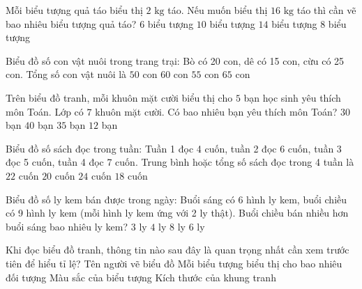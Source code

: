 \begin{ex} %
Mỗi biểu tượng quả táo biểu thị $2\text{ kg}$ táo. Nếu muốn biểu thị $16\text{ kg}$ táo thì cần vẽ bao nhiêu biểu tượng quả táo?
\choice
{$6$ biểu tượng}
{$10$ biểu tượng}
{$14$ biểu tượng}
{\True $8$ biểu tượng}
\end{ex}

\begin{ex} %
Biểu đồ số con vật nuôi trong trang trại: Bò có 20 con, dê có 15 con, cừu có 25 con. Tổng số con vật nuôi là
\choice
{$50$ con}
{\True $60$ con}
{$55$ con}
{$65$ con}
\end{ex}

\begin{ex} %
Trên biểu đồ tranh, mỗi khuôn mặt cười biểu thị cho $5$ bạn học sinh yêu thích môn Toán. Lớp có $7$ khuôn mặt cười. Có bao nhiêu bạn yêu thích môn Toán?
\choice
{$30$ bạn}
{$40$ bạn}
{\True $35$ bạn}
{$12$ bạn}
\end{ex}

\begin{ex} %
Biểu đồ số sách đọc trong tuần: Tuần 1 đọc 4 cuốn, tuần 2 đọc 6 cuốn, tuần 3 đọc 5 cuốn, tuần 4 đọc 7 cuốn. Trung bình hoặc tổng số sách đọc trong 4 tuần là
\choice
{\True $22$ cuốn}
{$20$ cuốn}
{$24$ cuốn}
{$18$ cuốn}
\end{ex}

\begin{ex} %
Biểu đồ số ly kem bán được trong ngày: Buổi sáng có 6 hình ly kem, buổi chiều có 9 hình ly kem (mỗi hình ly kem ứng với 2 ly thật). Buổi chiều bán nhiều hơn buổi sáng bao nhiêu ly kem?
\choice
{$3$ ly}
{$4$ ly}
{$8$ ly}
{\True $6$ ly}
\end{ex}

\begin{ex} %
Khi đọc biểu đồ tranh, thông tin nào sau đây là quan trọng nhất cần xem trước tiên để hiểu tỉ lệ?
\choice
{Tên người vẽ biểu đồ}
{\True Mỗi biểu tượng biểu thị cho bao nhiêu đối tượng}
{Màu sắc của biểu tượng}
{Kích thước của khung tranh}
\end{ex}

